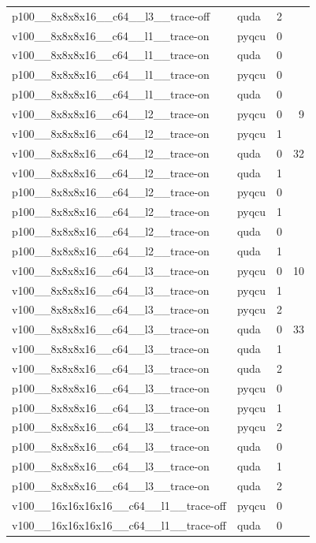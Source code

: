\begin{table}[htbp]
\begin{tabular}{@{}llrr@{}}
p100\_\_8x8x8x16\_\_c64\_\_l3\_\_trace-off & quda & 2 &  \\
v100\_\_8x8x8x16\_\_c64\_\_l1\_\_trace-on & pyqcu & 0 &  \\
v100\_\_8x8x8x16\_\_c64\_\_l1\_\_trace-on & quda & 0 &  \\
p100\_\_8x8x8x16\_\_c64\_\_l1\_\_trace-on & pyqcu & 0 &  \\
p100\_\_8x8x8x16\_\_c64\_\_l1\_\_trace-on & quda & 0 &  \\
v100\_\_8x8x8x16\_\_c64\_\_l2\_\_trace-on & pyqcu & 0 & 9 \\
v100\_\_8x8x8x16\_\_c64\_\_l2\_\_trace-on & pyqcu & 1 &  \\
v100\_\_8x8x8x16\_\_c64\_\_l2\_\_trace-on & quda & 0 & 32 \\
v100\_\_8x8x8x16\_\_c64\_\_l2\_\_trace-on & quda & 1 &  \\
p100\_\_8x8x8x16\_\_c64\_\_l2\_\_trace-on & pyqcu & 0 &  \\
p100\_\_8x8x8x16\_\_c64\_\_l2\_\_trace-on & pyqcu & 1 &  \\
p100\_\_8x8x8x16\_\_c64\_\_l2\_\_trace-on & quda & 0 &  \\
p100\_\_8x8x8x16\_\_c64\_\_l2\_\_trace-on & quda & 1 &  \\
v100\_\_8x8x8x16\_\_c64\_\_l3\_\_trace-on & pyqcu & 0 & 10 \\
v100\_\_8x8x8x16\_\_c64\_\_l3\_\_trace-on & pyqcu & 1 &  \\
v100\_\_8x8x8x16\_\_c64\_\_l3\_\_trace-on & pyqcu & 2 &  \\
v100\_\_8x8x8x16\_\_c64\_\_l3\_\_trace-on & quda & 0 & 33 \\
v100\_\_8x8x8x16\_\_c64\_\_l3\_\_trace-on & quda & 1 &  \\
v100\_\_8x8x8x16\_\_c64\_\_l3\_\_trace-on & quda & 2 &  \\
p100\_\_8x8x8x16\_\_c64\_\_l3\_\_trace-on & pyqcu & 0 &  \\
p100\_\_8x8x8x16\_\_c64\_\_l3\_\_trace-on & pyqcu & 1 &  \\
p100\_\_8x8x8x16\_\_c64\_\_l3\_\_trace-on & pyqcu & 2 &  \\
p100\_\_8x8x8x16\_\_c64\_\_l3\_\_trace-on & quda & 0 &  \\
p100\_\_8x8x8x16\_\_c64\_\_l3\_\_trace-on & quda & 1 &  \\
p100\_\_8x8x8x16\_\_c64\_\_l3\_\_trace-on & quda & 2 &  \\
v100\_\_16x16x16x16\_\_c64\_\_l1\_\_trace-off & pyqcu & 0 &  \\
v100\_\_16x16x16x16\_\_c64\_\_l1\_\_trace-off & quda & 0 &  \\

\end{tabular}
\end{table}

